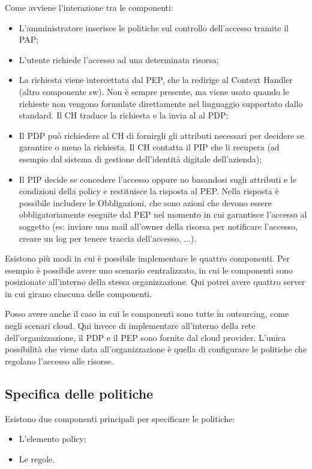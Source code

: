 \noindent Come avviene l'interazione tra le componenti:
\begin{itemize}
    \item L'amministratore inserisce le politiche sul controllo dell'accesso tramite il PAP;
    \item L'utente richiede l'accesso ad una determinata risorsa;
    \item La richiesta viene intercettata dal PEP, che la redirige al Context Handler (altro componente sw). Non è sempre presente, ma viene usato quando le richieste non vengono formulate direttamente nel linguaggio supportato dallo standard. Il CH traduce la richiesta e la invia al al PDP;
    \item Il PDP può richiedere al CH di fornirgli gli attributi necessari per decidere se garantire o meno la richiesta. Il CH contatta il PIP che li recupera (ad esempio dal sistema di gestione dell'identità digitale dell'azienda);
    \item Il PIP decide se concedere l'accesso oppure no basandosi sugli attributi e le condizioni della policy e restituisce la risposta al PEP. Nella risposta è possibile includere le Obbligazioni, che sono azioni che devono essere obbligatoriamente eseguite dal PEP nel momento in cui garantisce l'accesso al soggetto (es: inviare una mail all'owner della risorsa per notificare l'accesso, creare un log per tenere traccia dell'accesso, ...).
\end{itemize}

\noindent Esistono più modi in cui è possibile implementare le quattro componenti. Per esempio è possibile avere uno scenario centralizzato, in cui le componenti sono posizionate all'interno della stessa organizzazione. Qui potrei avere quattro server in cui girano ciascuna delle componenti.

Posso avere anche il caso in cui le componenti sono tutte in outsurcing, come negli scenari cloud. Qui invece di implementare all'interno della rete dell'organizzazione, il PDP e il PEP sono fornite dal cloud provider. L'unica possibilità che viene data all'organizzazione è quella di configurare le politiche che regolano l'accesso alle risorse.

\subsection{Specifica delle politiche}
Esistono due componenti principali per specificare le politiche:
\begin{itemize}
    \item L'elemento policy;
    \item Le regole.
\end{itemize}

